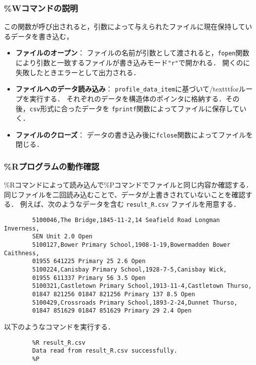     \subsubsection{\%Wコマンドの説明}
    この関数が呼び出されると，引数によって与えられたファイルに現在保持しているデータを書き込む，
    
    \begin{itemize}
      \item\textbf{ファイルのオープン}：
      ファイルの名前が引数として渡されると，\texttt{fopen}関数により引数と一致するファイルが書き込みモード\texttt{"r"}で開かれる．
      開くのに失敗したときエラーとして出力される．
      \item\textbf{ファイルへのデータ読み込み}：
      \texttt{profile\_data\_item}に基づいて/texttt{for}ループを実行する．
      それぞれのデータを構造体のポインタに格納する．その後，\texttt{csv}形式に合ったデータを
      \texttt{fprintf}関数によってファイルに保存していく．
      \item \textbf{ファイルのクローズ}：
      データの書き込み後に\texttt{fclose}関数によってファイルを閉じる．


    \end{itemize}
    \clearpage
    \subsubsection{\%Rプログラムの動作確認}
        \%Rコマンドによって読み込んで\%Pコマンドでファイルと同じ内容か確認する．同じファイルを二回読み込むことで、データが上書きされていないことを確認する．
        例えば、次のようなデータを含む \texttt{result\_R.csv} ファイルを用意する．
        \begin{verbatim}
        5100046,The Bridge,1845-11-2,14 Seafield Road Longman Inverness,
        SEN Unit 2.0 Open
        5100127,Bower Primary School,1908-1-19,Bowermadden Bower Caithness,
        01955 641225 Primary 25 2.6 Open
        5100224,Canisbay Primary School,1928-7-5,Canisbay Wick,
        01955 611337 Primary 56 3.5 Open
        5100321,Castletown Primary School,1913-11-4,Castletown Thurso,
        01847 821256 01847 821256 Primary 137 8.5 Open
        5100429,Crossroads Primary School,1893-2-24,Dunnet Thurso,
        01847 851629 01847 851629 Primary 29 2.4 Open
        \end{verbatim}

        以下のようなコマンドを実行する．
        \begin{verbatim}
        %R result_R.csv
        Data read from result_R.csv successfully.
        %P
        \end{verbatim}

